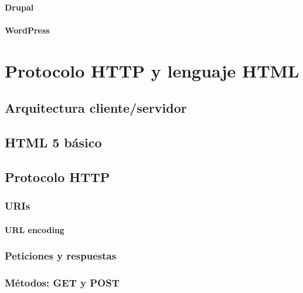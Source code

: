 \documentclass[a4paper,12pt,spanish]{sphinxmanual}
\begin{document}
\subsubsection{Drupal}
\label{\detokenize{introduccion:drupal}}

\subsubsection{WordPress}
\label{\detokenize{introduccion:wordpress}}

\chapter{Protocolo HTTP y lenguaje HTML}
\label{\detokenize{introduccion:protocolo-http-y-lenguaje-html}}

\section{Arquitectura cliente/servidor}
\label{\detokenize{introduccion:arquitectura-cliente-servidor}}

\section{HTML 5 básico}
\label{\detokenize{introduccion:html-5-basico}}

\section{Protocolo HTTP}
\label{\detokenize{introduccion:protocolo-http}}

\subsection{URIs}
\label{\detokenize{introduccion:uris}}

\subsubsection{URL encoding}
\label{\detokenize{introduccion:url-encoding}}

\subsection{Peticiones y respuestas}
\label{\detokenize{introduccion:peticiones-y-respuestas}}

\subsection{Métodos: GET y POST}
\label{\detokenize{introduccion:metodos-get-y-post}}
\end{document}
